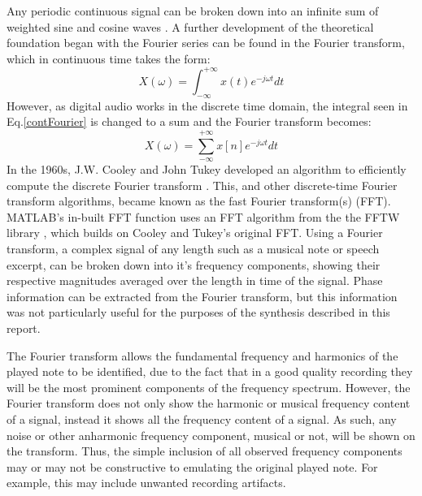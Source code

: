 \documentclass{article}
\begin{document}
        Any periodic continuous signal can be broken down into an infinite sum of weighted sine and cosine waves \cite{weisstein2004fourier}.
        A further development of the theoretical foundation began with the Fourier series can be found in the Fourier transform, which in continuous time takes the form:
        \begin{equation}
            X(\omega) = \int_{-\infty}^{+\infty}x(t)e^{-j\omega t}dt
            \label{contFourier}
        \end{equation}
        However, as digital audio works in the discrete time domain, the integral seen in Eq.\ref{contFourier} is changed to a sum and the Fourier transform becomes:
        \begin{equation}
            X(\omega) = \sum_{-\infty}^{+\infty}x[n]e^{-j\omega t}dt
        \end{equation}
        In the 1960s, J.W. Cooley and John Tukey developed an algorithm to efficiently compute the discrete Fourier transform \cite{cooley1965algorithm}.
        This, and other discrete-time Fourier transform algorithms, became known as the fast Fourier transform(s) (FFT).
        MATLAB's in-built FFT function uses an FFT algorithm from the the FFTW library \cite{frigo1998fftw}, which builds on Cooley and Tukey's original FFT.
        Using a Fourier transform, a complex signal of any length such as a musical note or speech excerpt, can be broken down into it's frequency components, showing their respective magnitudes averaged over the length in time of the signal.
        Phase information can be extracted from the Fourier transform, but this information was not particularly useful for the purposes of the synthesis described in this report.
        
        The Fourier transform allows the fundamental frequency and harmonics of the played note to be identified, due to the fact that in a good quality recording they will be the most prominent components of the frequency spectrum.
        However, the Fourier transform does not only show the harmonic or musical frequency content of a signal, instead it shows all the frequency content of a signal.
        As such, any noise or other anharmonic frequency component, musical or not, will be shown on the transform.
        Thus, the simple inclusion of all observed frequency components may or may not be constructive to emulating the original played note.
        For example, this may include unwanted recording artifacts.
        
\end{document}
